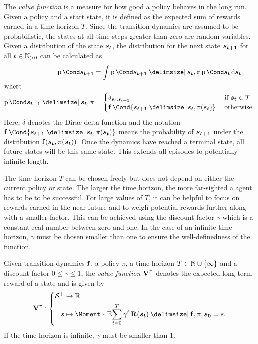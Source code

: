 The \emph{value function} is a measure for how good a policy behaves in the long run.
Given a policy and a start state, it is defined as the expected sum of rewards earned in a time horizon $T$.
Since the transition dynamics are assumed to be probabilistic, the states at all time steps greater than zero are random variables.
Given a distribution of the state $\bm{s_t}$, the distribution for the next state $\bm{s_{t+1}}$ for all $t \in \mathbb{N}_{>0}$ can be calculated as
\begin{align}
    \Prob{\rv{s_{t+1}}} &= \int \Prob{\rv{s_{t+1}} \given \rv{s_t}, \pi}\Prob{\rv{s_t}} \diff \rv{s_t} \\
    \intertext{where}
    \Prob{\rv{s_{t+1}} \given \rv{s_t}, \pi} &= \begin{cases}
        \delta_{\rv{s_t}, \rv{s_{t+1}}} & \text{ if $\rv{s_t} \in \Tee$} \\
        \Dyn\Cond{\rv{s_{t+1}} \given \rv{s_t}, \pi(\rv{s_t})} & \text{ otherwise.}
    \end{cases}
\end{align}
Here, $\delta$ denotes the Dirac-delta-function and the notation $\Dyn\Cond{\rv{s_{t+1}} \given \rv{s_t}, \pi(\rv{s_t})}$ means the probability of $\bm{s_{t+1}}$ under the distribution $\Dyn(\rv{s_t}, \pi(\rv{s_t}))$.
Once the dynamics have reached a terminal state, all future states will be this same state.
This extends all episodes to potentially infinite length.

The time horizon $T$ can be chosen freely but does not depend on either the current policy or state.
The larger the time horizon, the more far-sighted a agent has to be to be successful.
For large values of $T$, it can be helpful to focus on rewards earned in the near future and to weigh potential rewards further along with a smaller factor.
This can be achieved using the discount factor $\gamma$ which is a constant real number between zero and one.
In the case of an infinite time horizon, $\gamma$ must be chosen smaller than one to ensure the well-definedness of the function.

\begin{definition}
    \label{def:value_function}
    Given transition dynamics $\operatorname{\mathbf{f}}$, a policy $\pi$, a time horizon $T \in \mathbb{N} \cup \left\{ \infty \right\}$ and a discount factor $0 \leq \gamma \leq 1$, the \emph{value function $\Vlu^\pi$} denotes the expected long-term reward of a state and is given by
    \begin{align}
        \Vlu^\pi : \left\{
            \begin{aligned}
                \Es^+ &\to \R \\
                s &\mapsto \Moment*{\E}{\sum_{t=0}^T \gamma^t \Rwd(\rv{s_t}) \given \Dyn, \pi, \rv{s_0} = s }.
            \end{aligned}
        \right.
    \end{align}
    If the time horizon is infinite, $\gamma$ must be smaller than 1.
\end{definition}

